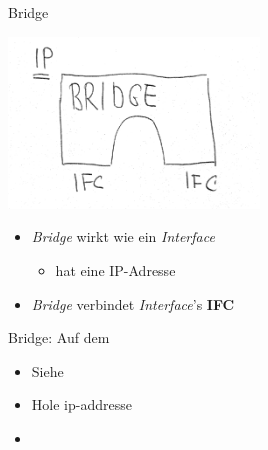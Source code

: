 \begin{frame}{Bridge}
 \begin{center}
 \includegraphics[width=0.5\textwidth]{bridge-picture.pdf}
 \end{center}
 \begin{itemize}
  \item {\em Bridge} wirkt wie ein {\em Interface} 
  \begin{itemize}
   \item hat eine IP-Adresse 
  \end{itemize}
  \item {\em Bridge} verbindet {\em Interface}'s {\bf IFC}
 \end{itemize}
\end{frame}

\begin{frame}{Bridge: }{Auf dem \host}
 \begin{itemize}
  \item Siehe 
  \item Hole ip-addresse
  \item {}
 \end{itemize}
\end{frame}
